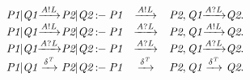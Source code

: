 \newcommand{\TcanBeInvokedConcurrently}    [1]{\mathrm{canBeInvokedConcurrently}(#1)} %
\newcommand{\TminimumStartInterval}        [2]{\mathrm{minimumStartInterval}(#1,#2)}  %
\newcommand{\TdataReceived}                [1]{\mathrm{dataReceived}(#1)}

\newcommand{\Tless}                        [2]{#1<#2}
\newcommand{\Tlesseq}                      [2]{#1 \leq #2}

\newcommand{\Tcall}         [2]{\mathrm{call}(#1,#2)}
\newcommand{\Tsnd}          [2]{\mathrm{snd}(#1,#2)}
\newcommand{\Tirvr}         [1]{\mathrm{irvr}(#1)}
\newcommand{\Tirvw}         [1]{\mathrm{irvw}(#1)}
\newcommand{\Trcv}          [1]{\mathrm{rcv}(#1)}
\newcommand{\Trd}           [1]{\mathrm{rd}(#1)}
\newcommand{\Twr}           [1]{\mathrm{wr}(#1)}
\newcommand{\Tres}          [1]{\mathrm{res}(#1)}
\newcommand{\Tret}          [1]{\mathrm{ret}(#1)}
\newcommand{\Tup}           [1]{\mathrm{up}(#1)}


\newcommand{\Teps}                            {eps}
\newcommand{\Tequal}                          {equal}
\newcommand{\Tfalse}                          {false}
\newcommand{\Tidle}                           {idle}
\newcommand{\Tinvalid}                        {invalid}
\newcommand{\Tlength}                         {length}
\newcommand{\Tlimit}                          {limit}
\newcommand{\Tmember}                         {member}
\newcommand{\Tminus}                          {minus}
\newcommand{\Tok}                             {ok}
\newcommand{\ToperationInvoked}               {operationInvoked}
\newcommand{\Tplus}                           {plus}

\newcommand{\TserverCallPoint}                {serverCallPoint}
\newcommand{\Tsync}                           {sync}
\newcommand{\Ttiming}                         {timing}

\[
\begin{array}{r@{}c@{}lcr@{}c@{}lr@{}c@{}l}
\Prule{\Tstep{\Tpar{\Tvar{P1}}{\Tvar{Q1}}}{\Tsay{\Tvar{A}}{\Tvar{L}}}{\Tpar{\Tvar{P2}}{\Tvar{Q2}}}}{\Tstep{\Tvar{P1}}{\Tsay{\Tvar{A}}{\Tvar{L}}}{\Tvar{P2}},\Tstep{\Tvar{Q1}}{\Thear{\Tvar{A}}{\Tvar{L}}}{\Tvar{Q2}}}.
\\\Prule{\Tstep{\Tpar{\Tvar{P1}}{\Tvar{Q1}}}{\Tsay{\Tvar{A}}{\Tvar{L}}}{\Tpar{\Tvar{P2}}{\Tvar{Q2}}}}{\Tstep{\Tvar{P1}}{\Thear{\Tvar{A}}{\Tvar{L}}}{\Tvar{P2}},\Tstep{\Tvar{Q1}}{\Tsay{\Tvar{A}}{\Tvar{L}}}{\Tvar{Q2}}}.
\\\Prule{\Tstep{\Tpar{\Tvar{P1}}{\Tvar{Q1}}}{\Thear{\Tvar{A}}{\Tvar{L}}}{\Tpar{\Tvar{P2}}{\Tvar{Q2}}}}{\Tstep{\Tvar{P1}}{\Thear{\Tvar{A}}{\Tvar{L}}}{\Tvar{P2}},\Tstep{\Tvar{Q1}}{\Thear{\Tvar{A}}{\Tvar{L}}}{\Tvar{Q2}}}.
\\\Prule{\Tstep{\Tpar{\Tvar{P1}}{\Tvar{Q1}}}{\Tdelta{\Tvar{T}}}{\Tpar{\Tvar{P2}}{\Tvar{Q2}}}}{\Tstep{\Tvar{P1}}{\Tdelta{\Tvar{T}}}{\Tvar{P2}},\Tstep{\Tvar{Q1}}{\Tdelta{\Tvar{T}}}{\Tvar{Q2}}}.
\end{array}
\]

